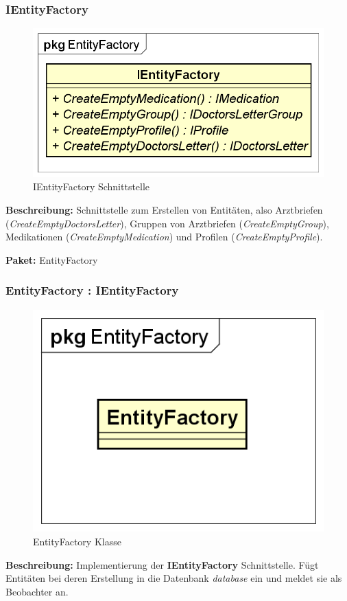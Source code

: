 \documentclass[a4paper]{scrreprt}
\begin{document}
\subsubsection{IEntityFactory}
\begin{figure}[H]
\centering
\includegraphics[width=0.45\textheight]{graphics/Klassendiagramme/Model/IEntityFactory.png}
\caption{IEntityFactory Schnittstelle}
\end{figure}
\textbf{Beschreibung:} Schnittstelle zum Erstellen von Entitäten, also Arztbriefen (\textit{CreateEmptyDoctorsLetter}), Gruppen von Arztbriefen (\textit{CreateEmptyGroup}), Medikationen (\textit{CreateEmptyMedication}) und Profilen (\textit{CreateEmptyProfile}).

\textbf{Paket:} EntityFactory

\subsubsection{EntityFactory : IEntityFactory}
\begin{figure}[H]
\centering
\includegraphics[width=0.45\textheight]{graphics/Klassendiagramme/Model/EntityFactory.png}
\caption{EntityFactory Klasse}
\end{figure}
\textbf{Beschreibung:} Implementierung der \textbf{IEntityFactory} Schnittstelle. Fügt Entitäten bei deren Erstellung in die Datenbank \textit{database} ein und meldet sie als Beobachter an.
\end{document}
